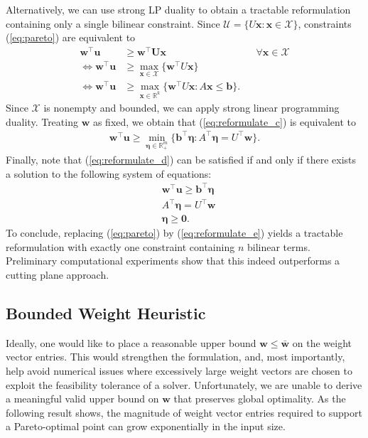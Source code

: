 \documentclass[a4paper, 11pt]{article}
\newcommand{\mc}{\mathcal}
\begin{document}
Alternatively, we can use strong LP duality to obtain a tractable reformulation containing only a single bilinear constraint. Since $\mc{U} = \{ U \bm{x} : \bm{x} \in \mc{X}\}$, constraints (\ref{eq:pareto}) are equivalent to 
\begin{subequations}
\begin{align}
\bm{w}^\top \bm{u} & \geq \bm{w}^\top \bm{U \bm{x}} && \forall \bm{x} \in \mc{X} \label{eq:reformulate_a} \\
\iff \bm{w}^\top \bm{u} & \geq \max_{\bm{x} \in \mc{X}} \{ \bm{w}^\top U \bm{x} \} \label{eq:reformulate_b} \\ 
\iff \bm{w}^\top \bm{u} & \geq \max_{\bm{x} \in \mathbb{R}^k} \{ \bm{w}^\top U \bm{x} : A \bm{x} \leq \bm{b} \}.  \label{eq:reformulate_c}
\end{align}
\end{subequations}
Since $\mc{X}$ is nonempty and bounded, we can apply strong linear programming duality. Treating $\bm{w}$ as fixed, we obtain that (\ref{eq:reformulate_c}) is equivalent to 
\begin{align}
\bm{w}^{\top} \bm{u} \geq \min_{\bm{\eta} \in \mathbb{R}^{m}_{+}} \{ \bm{b}^\top \bm{\eta} : A^\top \bm{\eta} = U^\top \bm{w} \}. \label{eq:reformulate_d}
\end{align}
Finally, note that (\ref{eq:reformulate_d}) can be satisfied if and only if there exists a solution to the following system of equations:
\begin{subequations}
\begin{align}
&\bm{w}^\top \bm{u} \geq \bm{b}^\top \bm{\eta} \label{eq:cons_bilinear} \\
& A^\top \bm{\eta} = U^\top \bm{w} \\ 
& \bm{\eta} \geq \bm{0}. 
\end{align}
\label{eq:reformulate_e}
\end{subequations}
To conclude, replacing (\ref{eq:pareto}) by (\ref{eq:reformulate_e}) yields a tractable reformulation with exactly one constraint containing $n$ bilinear terms. Preliminary computational experiments show that this indeed outperforms a cutting plane approach.

\subsection{Bounded Weight Heuristic}

Ideally, one would like to place a reasonable upper bound $\bm{w} \leq \bm{\bar{w}}$ on the weight vector entries. This would strengthen the formulation, and, most importantly, help avoid numerical issues where excessively large weight vectors are chosen to exploit the feasibility tolerance of a solver. Unfortunately, we are unable to derive a meaningful valid upper bound on $\bm{w}$ that preserves global optimality. As the following result shows, the magnitude of weight vector entries required to support a Pareto-optimal point can grow exponentially in the input size. 
\end{document}
